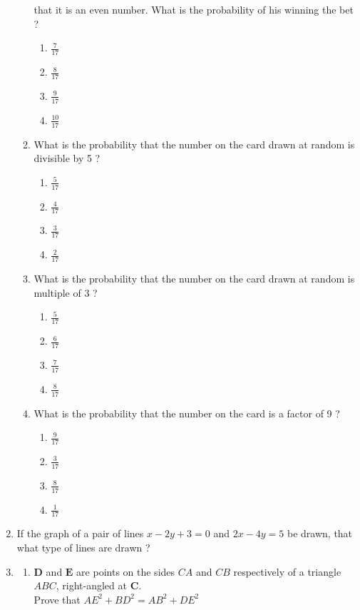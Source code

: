 \documentclass{article}
\let\vec\mathbf
\begin{document}
\begin{enumerate}
\begin{enumerate}
				that it is an even number. What is the probability of his winning the bet ? 
				\begin{enumerate}
					\item $ \frac{7}{17} $
					\item $ \frac{8}{17} $
					\item $ \frac{9}{17} $
					\item $ \frac{10}{17} $
				\end{enumerate}
			\item What is the probability that the number on the card drawn at random is divisible 
				by 5 ?
				\begin{enumerate}
					\item $ \frac{5}{17} $
					\item $ \frac{4}{17} $
					\item $ \frac{3}{17} $
					\item $ \frac{2}{17} $
				\end{enumerate}
			\item What is the probability that the number on the card drawn at random is multiple 
				of 3 ? 
				\begin{enumerate}
					\item $ \frac{5}{17} $
					\item $ \frac{6}{17} $
					\item $ \frac{7}{17} $
					\item $ \frac{8}{17} $
				\end{enumerate}
			\item What is the probability that the number on the card is a factor of 9 ?
				\begin{enumerate}
					\item $ \frac{9}{17} $
					\item $ \frac{3}{17} $
					\item $ \frac{8}{17} $
					\item $ \frac{1}{17} $
				\end{enumerate}
		\end{enumerate}
	\item If the graph of a pair of lines $ x - 2y + 3 = 0 $ and $ 2x - 4y = 5 $ be drawn, that what type of 
		lines are drawn ? 
	\item
		\begin{enumerate}
			\item $ \vec{D} $ and $ \vec{E} $ are points on the sides $ CA $ and $ CB $ respectively 
				of a triangle $ ABC $, right-angled at $ \vec{C} $. \\
		        Prove that $ AE^2 + BD^2 =AB^2 + DE^2 $ 


\end{enumerate}
\end{enumerate}
\end{document}
